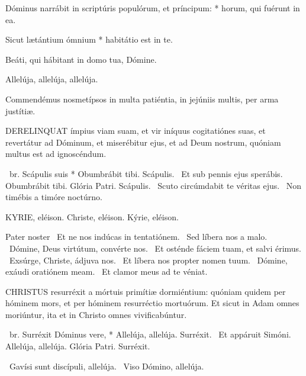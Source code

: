 Dóminus narrábit in scriptúris populórum, et príncipum: * horum, qui fuérunt in ea.

Sicut lætántium ómnium * habitátio est in te.

  Beáti, qui hábitant in domo tua, Dómine.

  Allelúja, allelúja, allelúja.



 Commendémus nosmetípsos in multa patiéntia, in jejúniis multis, per arma justítiæ.


\lettrine[lines=2]{D}{ERELINQUAT} ímpius viam suam, et vir iníquus cogitatiónes suas, et revertátur ad Dóminum, et miserébitur ejus, et ad Deum nostrum, quóniam multus est ad ignoscéndum.

\R\ br. Scápulis suis * Obumbrábit tibi. Scápulis. \V\ Et sub pennis ejus sperábis. Obumbrábit tibi. Glória Patri. Scápulis. \V\ Scuto circúmdabit te véritas ejus. \R\ Non timébis a timóre noctúrno.


KYRIE, eléison. Christe, eléison. Kýrie, eléison.

Pater noster  \V\ Et ne nos indúcas in tentatiónem. \R\ Sed líbera nos a malo. \V\ Dómine, Deus virtútum, convérte nos. \R\ Et osténde fáciem tuam, et salvi érimus. \V\ Exsúrge, Christe, ádjuva nos. \R\ Et líbera nos propter nomen tuum. \V\ Dómine, exáudi oratiónem meam. \R\ Et clamor meus ad te véniat.




\lettrine[lines=2]{C}{HRISTUS} resurréxit a mórtuis primítiæ dormiéntium: quóniam quidem per hóminem mors, et per hóminem resurréctio mortuórum. Et sicut in Adam omnes moriúntur, ita et in Christo omnes vivificabúntur.

\R\ br. Surréxit Dóminus vere, * Allelúja, allelúja. Surréxit. \V\ Et appáruit Simóni. Allelúja, allelúja. Glória Patri. Surréxit.

\V\ Gavísi sunt discípuli, allelúja. \R\ Viso Dómino, allelúja.

